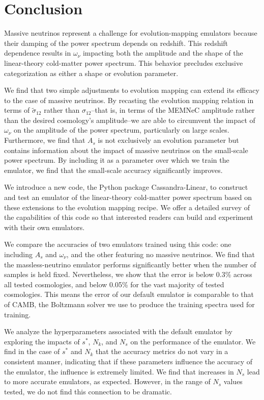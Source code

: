 \chapter{Conclusion}
\label{chap: conclusion}

Massive neutrinos represent a challenge for evolution-mapping emulators
because their damping of the power spectrum depends on redshift.
This redshift dependence results in $\omega_\nu$ impacting both the
amplitude and the shape of the linear-theory cold-matter power spectrum.
This behavior precludes exclusive categorization as either a shape or
evolution parameter.

We find that two simple adjustments to evolution mapping can extend its
efficacy to the case of massive neutrinos. By recasting the evolution mapping
relation in terms of $\tilde{\sigma}_12$ rather than $\sigma_{12}$--that is,
in terms of the MEMNeC amplitude rather than the desired cosmology's
amplitude--we are able to circumvent the impact of $\omega_\nu$ on the
amplitude of the power spectrum, particularly on large scales. Furthermore,
we find that $A_s$ is not exclusively an evolution parameter but contains
information about the impact of massive neutrinos on the small-scale
power spectrum. By including it as a parameter over which we train the
emulator, we find that the small-scale accuracy significantly improves.

We introduce a new code, the Python package Cassandra-Linear, to construct
and test an emulator of the linear-theory cold-matter power spectrum based on
these extensions to the evolution mapping recipe. We offer a detailed survey
of the capabilities of this code so that interested readers can build and
experiment with their own emulators.

We compare the accuracies of two emulators trained using this code: one
including $A_s$ and $\omega_\nu$, and the other featuring no massive 
neutrinos. We find that the massless-neutrino emulator performs significantly
better when the number of samples is held fixed. Nevertheless, we show that
the error is below 0.3\% across all tested cosmologies, and below 0.05\%
for the vast majority of tested cosmologies. This means
the error of our default emulator is
comparable to that of CAMB, the Boltzmann solver we use to produce the
training spectra used for training.

We analyze the hyperparameters associated with the default emulator by
exploring the impacts of $s^*$, $N_k$, and $N_s$ on the performance of the
emulator. We find in the case of $s^*$ and $N_k$ that the accuracy metrics do 
not vary in a consistent manner, indicating that if these parameters influence
the accuracy of the emulator, the influence is extremely limited. We find that
increases in $N_s$ lead to more accurate emulators, as expected. However, in
the range of $N_s$ values tested, we do not find this connection to be
dramatic.

